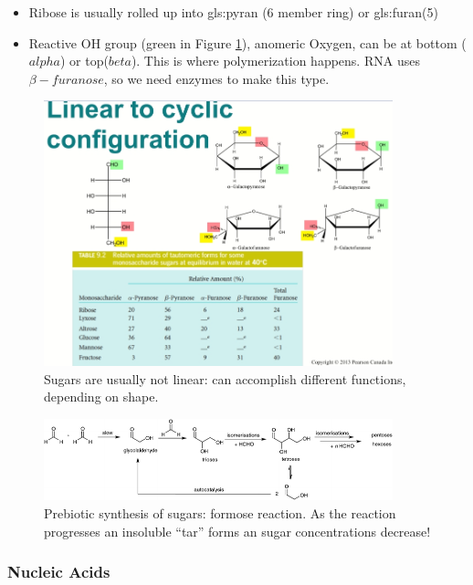 \documentclass[]{article}
\begin{document}
\begin{itemize}
	\item Ribose is usually rolled up into \gls{gls:pyran} (6 member ring) or \gls{gls:furan}(5)
	\item Reactive OH group (green in Figure \ref{fig:SugarTautomers}), anomeric Oxygen, can be at bottom ($alpha$) or top($beta$). This is where polymerization happens. RNA uses $\beta-furanose$, so we need enzymes to make this type.
\end{itemize}
\begin{figure}[H]
	\caption{Sugars are usually not linear: can accomplish different functions, depending on shape.}\label{fig:SugarTautomers} 
	\includegraphics[width=0.9\textwidth]{SugarTautomers}
\end{figure}

\begin{figure}[H]
	\caption{Prebiotic synthesis of sugars: formose reaction. As the reaction progresses an insoluble “tar” forms an sugar concentrations decrease!}\label{fig:SugarsPrebioticSynthesis} 
	\includegraphics[width=0.9\textwidth]{SugarsPrebioticSynthesis}
\end{figure}

\subsubsection{Nucleic Acids}
\end{document}
